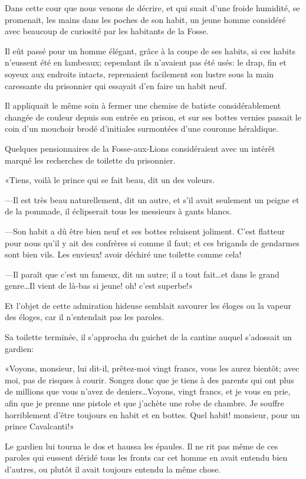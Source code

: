 Dans cette cour que nous venons de décrire, et qui suait d'une froide humidité, se promenait, les mains dans les poches de son habit, un jeune homme considéré avec beaucoup de curiosité par les habitants de la Fosse. 

Il eût passé pour un homme élégant, grâce à la coupe de ses habits, si ces habits n'eussent été en lambeaux; cependant ils n'avaient pas été usés: le drap, fin et soyeux aux endroits intacts, reprenaient facilement son lustre sous la main caressante du prisonnier qui essayait d'en faire un habit neuf. 

Il appliquait le même soin à fermer une chemise de batiste considérablement changée de couleur depuis son entrée en prison, et sur ses bottes vernies passait le coin d'un mouchoir brodé d'initiales surmontées d'une couronne héraldique. 

Quelques pensionnaires de la Fosse-aux-Lions considéraient avec un intérêt marqué les recherches de toilette du prisonnier. 

«Tiens, voilà le prince qui se fait beau, dit un des voleurs. 

—Il est très beau naturellement, dit un autre, et s'il avait seulement un peigne et de la pommade, il éclipserait tous les messieurs à gants blancs. 

—Son habit a dû être bien neuf et ses bottes reluisent joliment. C'est flatteur pour nous qu'il y ait des confrères si comme il faut; et ces brigands de gendarmes sont bien vils. Les envieux! avoir déchiré une toilette comme cela! 

—Il paraît que c'est un fameux, dit un autre; il a tout fait\dots et dans le grand genre\dots Il vient de là-bas si jeune! oh! c'est superbe!» 

Et l'objet de cette admiration hideuse semblait savourer les éloges ou la vapeur des éloges, car il n'entendait pas les paroles. 

Sa toilette terminée, il s'approcha du guichet de la cantine auquel s'adossait un gardien: 

«Voyons, monsieur, lui dit-il, prêtez-moi vingt francs, vous les aurez bientôt; avec moi, pas de risques à courir. Songez donc que je tiens à des parents qui ont plus de millions que vous n'avez de deniers\dots Voyons, vingt francs, et je vous en prie, afin que je prenne une pistole et que j'achète une robe de chambre. Je souffre horriblement d'être toujours en habit et en bottes. Quel habit! monsieur, pour un prince Cavalcanti!» 

Le gardien lui tourna le dos et haussa les épaules. Il ne rit pas même de ces paroles qui eussent déridé tous les fronts car cet homme en avait entendu bien d'autres, ou plutôt il avait toujours entendu la même chose. 

